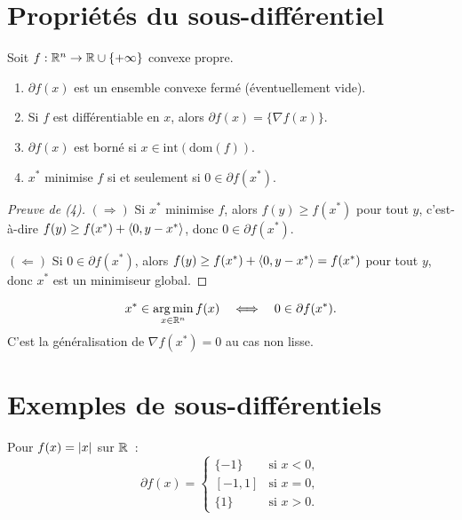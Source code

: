 \section{Propri\'et\'es du sous-diff\'erentiel}

\begin{theoreme}
\label{thm:prop_subdiff}
Soit $f : \mathbb{R}^n \to \mathbb{R} \cup \{+\infty\}$ convexe propre.
\begin{enumerate}
    \item $\partial f(x)$ est un ensemble convexe ferm\'e (\'eventuellement vide).
    \item Si $f$ est diff\'erentiable en $x$, alors $\partial f(x) = \{\nabla f(x)\}$.
    \item $\partial f(x)$ est born\'e si $x \in \mathrm{int}(\mathrm{dom}(f))$.
    \item $x^*$ minimise $f$ si et seulement si $0 \in \partial f(x^*)$.
\end{enumerate}
\end{theoreme}

\begin{proof}[Preuve de (4)]
$(\Rightarrow)$ Si $x^*$ minimise $f$, alors $f(y) \geq f(x^*)$ pour tout $y$,
c'est-\`a-dire $f(y) \geq f(x^*) + \langle 0, y - x^* \rangle$, donc $0 \in \partial f(x^*)$.

$(\Leftarrow)$ Si $0 \in \partial f(x^*)$, alors $f(y) \geq f(x^*) + \langle 0, y-x^* \rangle = f(x^*)$
pour tout $y$, donc $x^*$ est un minimiseur global.
\end{proof}

\begin{formules}[title=\textbf{Condition d'optimalit\'e sous-diff\'erentielle}]
\[
    x^* \in \operatorname*{arg\,min}_{x \in \mathbb{R}^n} f(x) \quad \Longleftrightarrow \quad 0 \in \partial f(x^*).
\]
C'est la g\'en\'eralisation de $\nabla f(x^*) = 0$ au cas non lisse.
\end{formules}

\section{Exemples de sous-diff\'erentiels}

\begin{exemple}
Pour $f(x) = \left| x \right|$ sur $\mathbb{R}$~:
\[
    \partial f(x) = \begin{cases}
        \{-1\} & \text{si } x < 0, \\
        [-1, 1] & \text{si } x = 0, \\
        \{1\} & \text{si } x > 0.
    \end{cases}
\]
\end{exemple}

